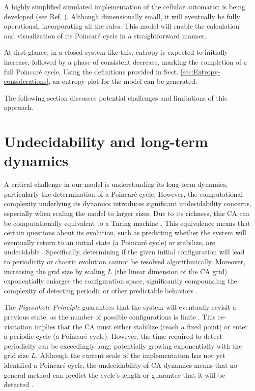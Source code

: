 \documentclass[12pt,english]{article}
\begin{document}
A highly simplified simulated implementation of the cellular automaton is being developed (see Ref. \cite{af_neto}). Although dimensionally small, it will eventually be fully operational, incorporating all the rules. This model will enable the calculation and visualization of its Poincaré cycle in a straightforward manner.

At first glance, in a closed system like this, entropy is expected to initially increase, followed by a phase of consistent decrease, marking the completion of a full Poincaré cycle. Using the definitions provided in Sect. \ref{sec:Entropy-considerations}, an entropy plot for the model can be generated.

The following section discusses potential challenges and limitations of this approach.

\section{Undecidability and long-term dynamics}\label{sec-undecidability}

A critical challenge in our model is understanding its long-term dynamics, particularly the determination of a Poincaré cycle. However, the computational complexity underlying its dynamics introduces significant undecidability concerns, especially when scaling the model to larger sizes. Due to its richness, this CA can be computationally equivalent to a Turing machine \cite{wolfram1983}. This equivalence means that certain questions about its evolution, such as predicting whether the system will eventually return to an initial state (a Poincaré cycle) or stabilize, are undecidable \cite{gacs1979}. Specifically, determining if the given initial configuration will lead to periodicity or chaotic evolution cannot be resolved algorithmically. Moreover, increasing the grid size by scaling \( L \) (the linear dimension of the CA grid) exponentially enlarges the configuration space, significantly compounding the complexity of detecting periodic or other predictable behaviors \cite{toffoli1980}.

The \textit{Pigeonhole Principle} guarantees that the system will eventually revisit a previous state, as the number of possible configurations is finite \cite{bernstein2007}. This re-visitation implies that the CA must either stabilize (reach a fixed point) or enter a periodic cycle (a Poincaré cycle). However, the time required to detect periodicity can be exceedingly long, potentially growing exponentially with the grid size \( L \). Although the current scale of the implementation has not yet identified a Poincaré cycle, the undecidability of CA dynamics means that no general method can predict the cycle's length or guarantee that it will be detected \cite{wolfram}.
\end{document}
